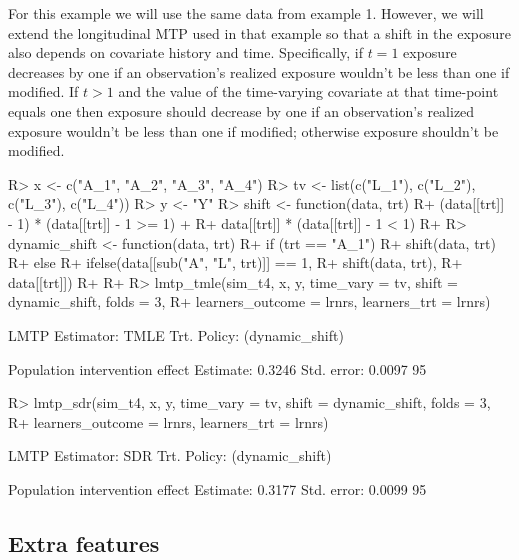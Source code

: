 \documentclass[]{jss}
\begin{document}
For this example we will use the same data from example 1. However, we will extend the longitudinal MTP used in that example so that a shift in the exposure also depends on covariate history and time. Specifically, if $t = 1$ exposure decreases by one if an observation's realized exposure wouldn’t be less than one if modified. If $t > 1$ and the value of the time-varying covariate at that time-point equals one then exposure should decrease by one if an observation's realized exposure wouldn’t be less than one if modified; otherwise exposure shouldn't be modified.

\begin{CodeChunk}

\begin{CodeInput}
R> x <- c("A_1", "A_2", "A_3", "A_4")
R> tv <- list(c("L_1"), c("L_2"), c("L_3"), c("L_4"))
R> y <- "Y"
R> shift <- function(data, trt) {
R+   (data[[trt]] - 1) * (data[[trt]] - 1 >= 1) + 
R+     data[[trt]] * (data[[trt]] - 1 < 1)
R+ }
R> dynamic_shift <- function(data, trt) {
R+   if (trt == "A_1") {
R+     shift(data, trt)
R+   } else {
R+     ifelse(data[[sub("A", "L", trt)]] == 1, 
R+            shift(data, trt),
R+            data[[trt]])
R+   }
R+ }
R> lmtp_tmle(sim_t4, x, y, time_vary = tv, shift = dynamic_shift, folds = 3, 
R+           learners_outcome = lrnrs, learners_trt = lrnrs)
\end{CodeInput}

\begin{CodeOutput}
LMTP Estimator: TMLE
   Trt. Policy: (dynamic_shift)

Population intervention effect
      Estimate: 0.3246
    Std. error: 0.0097
        95%
\end{CodeOutput}

\begin{CodeInput}
R> lmtp_sdr(sim_t4, x, y, time_vary = tv, shift = dynamic_shift, folds = 3, 
R+          learners_outcome = lrnrs, learners_trt = lrnrs)
\end{CodeInput}

\begin{CodeOutput}
LMTP Estimator: SDR
   Trt. Policy: (dynamic_shift)

Population intervention effect
      Estimate: 0.3177
    Std. error: 0.0099
        95%
\end{CodeOutput}

\end{CodeChunk}

\hypertarget{extra-features}{%
\subsection{Extra features}\label{extra-features}}
\end{document}
